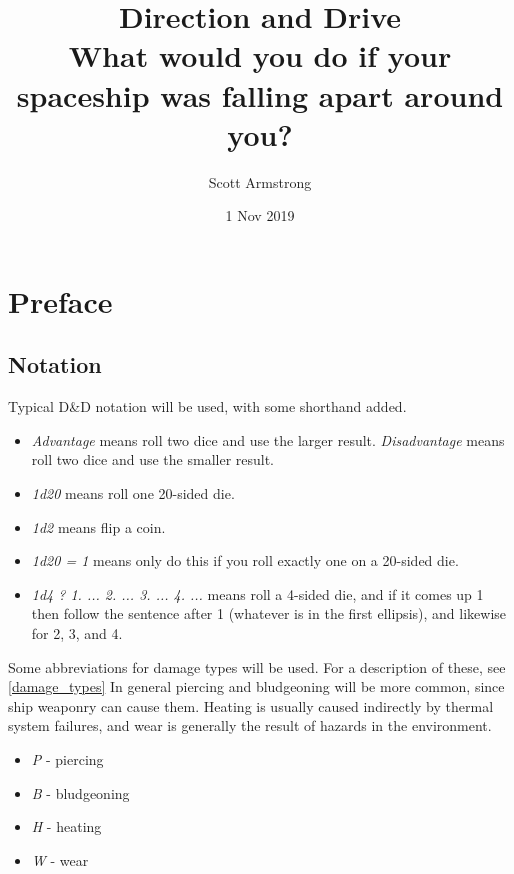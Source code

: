 \documentclass[a4paper]{article}
\title{Direction and Drive \\ {\large What would you do if your spaceship was falling apart around you?}}
\author{Scott Armstrong}
\date{1 Nov 2019}
\begin{document}
\maketitle

\begin{abstract}


\end{abstract}

\setcounter{tocdepth}{2}
\tableofcontents

\section{Preface} \label{preface}

\subsection{Notation} \label{preface_notation}
Typical D\&D notation will be used, with some shorthand added. 
\begin{itemize}
\item \textit{Advantage} means roll two dice and use the larger result. \textit{Disadvantage} means roll two dice and use the smaller result.
\item \textit{1d20} means roll one 20-sided die.
\item \textit{1d2} means flip a coin.
\item \textit{1d20 = 1} means only do this if you roll exactly one on a 20-sided die.
\item \textit{1d4 ? 1. ... 2. ... 3. ... 4. ...} means roll a 4-sided die, and if it comes up 1 then follow the sentence after 1 (whatever is in the first ellipsis), and likewise for 2, 3, and 4.
\end{itemize}

\vspace{0.2cm} \hspace{-18pt} Some abbreviations for damage types will be used. For a description of these, see \ref{damage_types} In general piercing and bludgeoning will be more common, since ship weaponry can cause them. Heating is usually caused indirectly by thermal system failures, and wear is generally the result of hazards in the environment.
\begin{itemize}
\item \textit{P} - piercing
\item \textit{B} - bludgeoning
\item \textit{H} - heating
\item \textit{W} - wear
\end{itemize}
\end{document}
